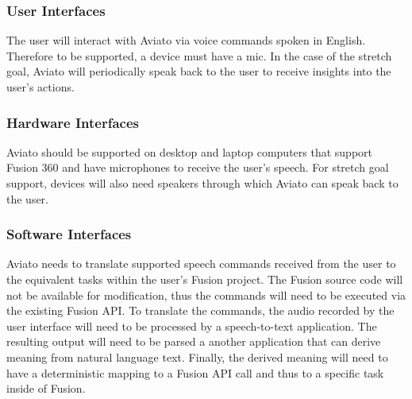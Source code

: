 \documentclass[onecolumn, draftclsnofoot,10pt, compsoc]{IEEEtran}
\def \botname{Aviato }
\begin{document}
        \subsubsection{User Interfaces}
            The user will interact with \botname via voice commands spoken in English. 
            Therefore to be supported, a device must have a mic.
            In the case of the stretch goal, \botname will periodically speak back to the user to receive insights into the user's actions.

        \subsubsection{Hardware Interfaces} %
            \botname should be supported on desktop and laptop computers that support Fusion 360 and have microphones to receive the user's speech.
            For stretch goal support, devices will also need speakers through which \botname can speak back to the user.

        \subsubsection{Software Interfaces}               
            \botname needs to translate supported speech commands received from the user to the equivalent tasks within the user's Fusion project.
            The Fusion source code will not be available for modification, thus the commands will need to be executed via the existing Fusion API.
            To translate the commands, the audio recorded by the user interface will need to be processed by a speech-to-text application.
            The resulting output will need to be parsed a another application that can derive meaning from natural language text.
            Finally, the derived meaning will need to have a deterministic mapping to a Fusion API call and thus to a specific task inside of Fusion.
\end{document}
